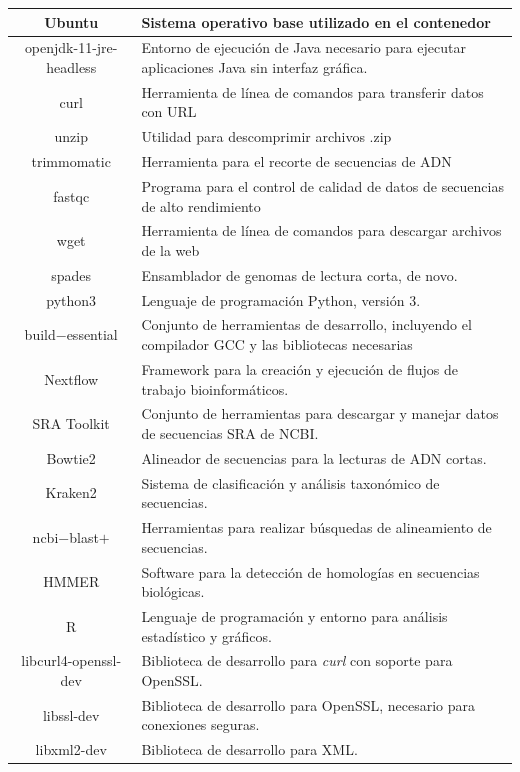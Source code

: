 \documentclass[12pt]{article}
\begin{document}
\begin{longtable}{|c|p{6cm}|}
    Ubuntu & Sistema operativo base utilizado en el contenedor \\
    \hline
    openjdk-11-jre-headless & Entorno de ejecución de Java necesario para ejecutar aplicaciones Java sin interfaz gráfica. \\
    \hline
    curl & Herramienta de línea de comandos para transferir datos con URL \\
    \hline
    unzip & Utilidad para descomprimir archivos .zip \\
    \hline
    trimmomatic & Herramienta para el recorte de secuencias de ADN \\
    \hline
    fastqc & Programa para el control de calidad de datos de secuencias de alto rendimiento \\
    \hline
    wget & Herramienta de línea de comandos para descargar archivos de la web \\
    \hline
    spades & Ensamblador de genomas de lectura corta, de novo. \\
    \hline
    python3 & Lenguaje de programación Python, versión 3.\\
    \hline
    build$-$essential & Conjunto de herramientas de desarrollo, incluyendo el compilador GCC y las bibliotecas necesarias \\
    \hline
    Nextflow & Framework para la creación y ejecución de flujos de trabajo bioinformáticos. \\
    \hline
    SRA Toolkit & Conjunto de herramientas para descargar y manejar datos de secuencias SRA de NCBI. \\
    \hline
    Bowtie2 & Alineador de secuencias para la lecturas de ADN cortas. \\
    \hline
    Kraken2 & Sistema de clasificación y análisis taxonómico de secuencias. \\
    \hline
    ncbi$-$blast$+$ & Herramientas para realizar búsquedas de alineamiento de secuencias. \\
    \hline
    HMMER & Software para la detección de homologías en secuencias biológicas. \\
    \hline
    R & Lenguaje de programación y entorno para análisis estadístico y gráficos. \\
    \hline
    libcurl4-openssl-dev & Biblioteca de desarrollo para \emph{curl} con soporte para OpenSSL. \\
    \hline
    libssl-dev & Biblioteca de desarrollo para OpenSSL, necesario para conexiones seguras. \\
    \hline
    libxml2-dev & Biblioteca de desarrollo para XML. \\

\end{longtable}
\end{document}

